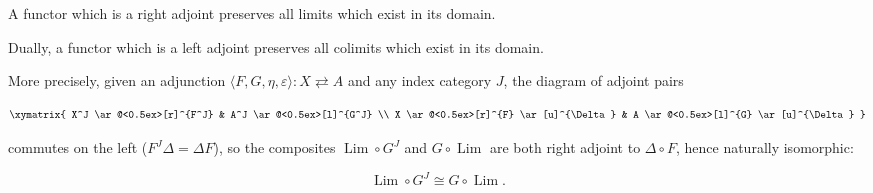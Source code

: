 A functor which is a right adjoint preserves all limits which exist in its domain.

Dually, a functor which is a left adjoint preserves all colimits which exist in its domain.

More precisely, given an adjunction $\langle F, G, \eta, \varepsilon \rangle : X \rightleftarrows A$ and any index category $J$, the diagram of adjoint pairs

$$\xymatrix{
X^J \ar@<0.5ex>[r]^{F^J} & A^J \ar@<0.5ex>[l]^{G^J} \\
X \ar@<0.5ex>[r]^{F} \ar[u]^{\Delta} & A \ar@<0.5ex>[l]^{G} \ar[u]^{\Delta}
}$$

commutes on the left ($F^J \Delta = \Delta F$), so the composites $\operatorname{Lim} \circ G^J$ and $G \circ \operatorname{Lim}$ are both right adjoint to $\Delta \circ F$, hence naturally isomorphic:

$$\operatorname{Lim} \circ G^J \cong G \circ \operatorname{Lim}.$$
